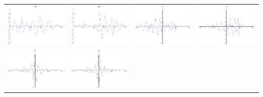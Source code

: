 \documentclass{article}
\begin{document}
\begin{landscape}
\begin{tabular}{cccc}
\includegraphics[width=5.0cm]{nonic_wavelet_5.pdf}& \includegraphics[width=5.0cm]{nonic_wavelet_6.pdf}& \includegraphics[width=5.0cm]{nonic_wavelet_7.pdf}& \includegraphics[width=5.0cm]{nonic_wavelet_8.pdf} \\
\includegraphics[width=5.0cm]{nonic_wavelet_9.pdf}& \includegraphics[width=5.0cm]{nonic_wavelet_10.pdf}\end{tabular} 
 \end{landscape}
\end{document}

